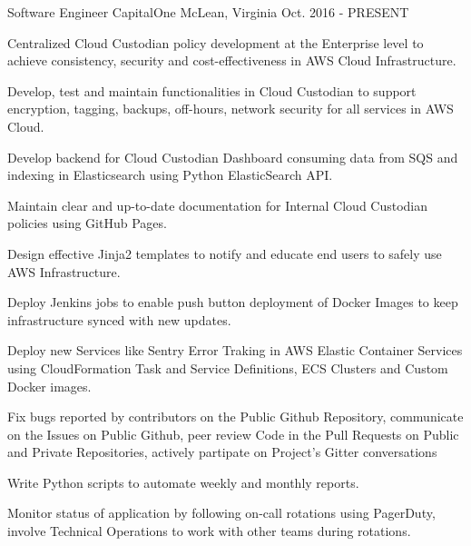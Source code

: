 

\begin{cventries}

  \cventry
    {Software Engineer} %
    {CapitalOne} %
    {McLean, Virginia} %
    {Oct. 2016 - PRESENT} %
    {
      \begin{cvitems} %
        \item {Centralized Cloud Custodian policy development at the Enterprise level to achieve consistency, security and cost-effectiveness in AWS Cloud Infrastructure.}
        \item {Develop, test and maintain functionalities in Cloud Custodian to support encryption, tagging, backups, off-hours, network security for all services in AWS Cloud.}
        \item {Develop backend for Cloud Custodian Dashboard consuming data from SQS and indexing in Elasticsearch using Python ElasticSearch API.}
        \item {Maintain clear and up-to-date documentation for Internal Cloud Custodian policies using GitHub Pages.}
        \item {Design effective Jinja2 templates to notify and educate end users to safely use AWS Infrastructure.}
        \item {Deploy Jenkins jobs to enable push button deployment of Docker Images to keep infrastructure synced with new updates.}
        \item {Deploy new Services like Sentry Error Traking in AWS Elastic Container Services using CloudFormation Task and Service Definitions, ECS Clusters and Custom Docker images.}
        \item {Fix bugs reported by contributors on the Public Github Repository, communicate on the Issues on Public Github, peer review Code in the Pull Requests on Public and Private Repositories, actively partipate on Project's Gitter conversations}
        \item {Write Python scripts to automate weekly and monthly reports.}
        \item {Monitor status of application by following on-call rotations using PagerDuty, involve Technical Operations to work with other teams during rotations.}

\end{cvitems}}
\end{cventries}
